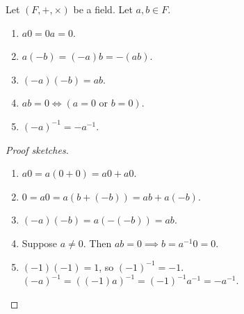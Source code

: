 \documentclass[a4paper, 12pt, fleqn]{article}
\begin{document}
\begin{lemma}
Let $(F, +, \times)$ be a field. Let $a, b \in F$.
\begin{enumerate}
\item $a0 = 0a = 0$.
\item $a(-b) = (-a)b = -(ab)$.
\item $(-a)(-b) = ab$.
\item $ab = 0 \iff (a = 0 \textrm{ or } b = 0)$.
\item $(-a)^{-1} = -a^{-1}$.
\end{enumerate}
\end{lemma}
\begin{proof}[Proof sketches]
\leavevmode
\begin{enumerate}
\item $a0 = a(0 + 0) = a0 + a0$.
\item $0 = a0 = a(b + (-b)) = ab + a(-b)$.
\item $(-a)(-b) = a(-(-b)) = ab$.
\item Suppose $a \neq 0$. Then $ab = 0 \implies b = a^{-1}0 = 0$.
\item $(-1)(-1) = 1$, so $(-1)^{-1} = -1$. $(-a)^{-1} = ((-1)a)^{-1} = (-1)^{-1}a^{-1} = -a^{-1}$.
\end{enumerate}
\end{proof}
\end{document}
